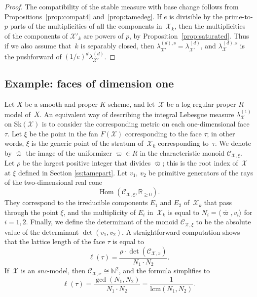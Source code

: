 \documentclass[JEP,XML,SOM,Unicode,NoFloatCountersInSection]{cedram}
\let\mathcal\mathscr
\theoremstyle{definition}
\numberwithin{equation}{subsection}
\newcommand{\N}{\ensuremath{\mathbb{N}}}
\newcommand{\R}{\ensuremath{\mathbb{R}}}
\newcommand{\cX}{\ensuremath{\mathscr{X}}}
\newcommand{\snc}{\textit{snc}}
\newcommand{\lcm}{\mathrm{lcm}}
\newcommand{\Sk}{\mathrm{Sk}}
\newcommand{\rs}{\mathrm{s}}
\DeclareMathOperator{\Hom}{Hom}
\let\Leb\lambda
\let\unif\varpi
\begin{document}
\begin{proof}
The compatibility of the stable measure with base change follows from Propositions~\ref{prop:compat4} and~\ref{prop:tamedeg}.
If $e$ is divisible by the prime-to-$p$ parts of the multiplicities of all the components in~$\cX_k$, then the multiplicities of the components of $\cX'_k$ are powers of $p$,
by Proposition~\ref{prop:saturated}. Thus if we also assume that~$k$ is separably closed, then $\Leb^{(d),\rs}_{\cX'}=\Leb^{(d)}_{\cX'}$, and
$\Leb^{(d),\rs}_{\cX}$ is the pushforward of $(1/e)^d\Leb^{(d)}_{\cX'}$.
\end{proof}

\subsection{Example: faces of dimension one}\label{sec:curve}
Let $X$ be a smooth and proper $K$\nobreakdash-scheme, and let~$\cX$ be a log regular proper $R$\nobreakdash-model of~$X$.
An equivalent way of describing the integral Lebesgue measure $\Leb^{(1)}_{\cX}$ on $\Sk(\cX)$
is to consider the corresponding metric on each one-dimensional face $\tau$. Let $\xi$ be the point in the fan $F(\cX)$ corresponding to the face $\tau$; in other words,
$\xi$ is the generic point of the stratum of~$\cX_k$ corresponding to~$\tau$. We denote by $\overline{\varpi}$ the image of the uniformizer $\unif\in R$ in the characteristic monoid $\mathcal{C}_{\cX,\xi}$.
Let $\rho$ be the largest positive integer that divides $\overline{\varpi}$; this is the root index of~$\cX$ at $\xi$ defined in Section \ref{ss:tamepart}.
Let $v_1$, $v_2$ be primitive generators of the rays of the two-dimensional real cone
\[
\Hom(\mathcal{C}_{\cX,\xi},\R_{\geq 0}).
\]
They correspond to the irreducible components $E_1$ and $E_2$ of~$\cX_k$ that pass through the point $\xi$, and the multiplicity of $E_i$ in~$\cX_k$ is equal to
$N_i=\langle \overline{\varpi},v_i \rangle$ for $i=1,2$. Finally, we define the determinant of the monoid $\mathcal{C}_{\cX,\xi}$ to be the absolute value of the determinant $\det(v_1,v_2)$.
A straightforward computation shows that the
lattice length of the face $\tau$ is equal to
\[
\ell(\tau)= \frac{\rho\cdot \det(\mathcal{C}_{\cX,x})}{N_1\cdot N_2}.
\]
If~$\cX$ is an \snc-model, then $\mathcal{C}_{\cX,x}\cong \N^2$, and the formula simplifies to
\[
\ell(\tau)= \frac{\gcd(N_1,N_2)}{N_1\cdot N_2}=\frac{1}{\lcm(N_1,N_2)}.
\]
\end{document}
